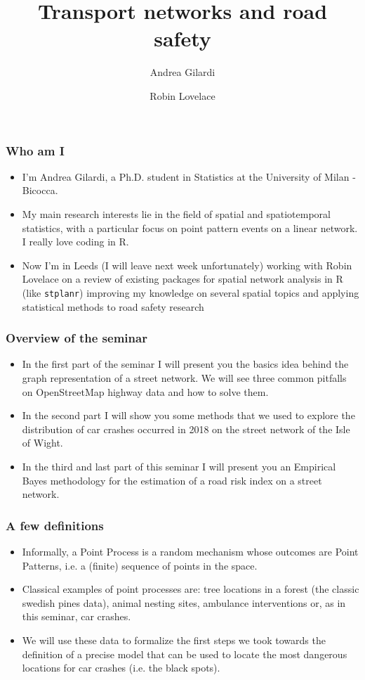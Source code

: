 \documentclass[c,10pt,pdftex]{beamer}
\title{Transport networks and road safety}
\author{Andrea Gilardi \inst{1} \and Robin Lovelace \inst{2}}
\institute{\inst{1} University of Milan - Bicocca \and \inst{2} University of Leeds - ITS}
\begin{document}
\inserttitlepage

\begin{frame}
\frametitle{Who am I}
\vspace{-0.75cm}
\begin{itemize}
	\setlength\itemsep{1em}
	\item I'm Andrea Gilardi, a Ph.D. student in Statistics at the University of Milan - Bicocca. 
	\item My main research interests lie in the field of spatial and spatiotemporal statistics, with a particular focus on point pattern events on a linear network. I really love coding in R. 
	
	\item Now I'm in Leeds (I will leave next week unfortunately) working with Robin Lovelace on a review of existing packages for spatial network analysis in R (like \texttt{stplanr}) improving my knowledge on several spatial topics and applying statistical methods to road safety research
\end{itemize}
\end{frame}

\begin{frame}
\frametitle{Overview of the seminar}
\begin{itemize}
	\item In the first part of the seminar I will present you the basics idea behind the graph representation of a street network. We will see three common pitfalls on OpenStreetMap highway data and how to solve them. 
	
	\item In the second part I will show you some methods that we used to explore the distribution of car crashes occurred in 2018 on the street network of the Isle of Wight.
	
	\item In the third and last part of this seminar I will present you an Empirical Bayes methodology for the estimation of a road risk index on a street network.  
\end{itemize}
\end{frame}

\begin{frame}
\frametitle{A few definitions}
\vspace{-0.75cm}
\begin{itemize}
	\setlength\itemsep{1em}
	\item Informally, a Point Process is a random mechanism whose outcomes are Point Patterns, i.e. a (finite) sequence of points in the space. 
	
	\item Classical examples of point processes are: tree locations in a forest (the classic swedish pines data), animal nesting sites, ambulance interventions or, as  in this seminar, \alert{car crashes}. 
	
	\item We will use these data to formalize the first steps we took towards the definition of a precise model that can be used to locate the most dangerous locations for car crashes (i.e. the black spots). 
\end{itemize}
\end{frame}
\end{document}

